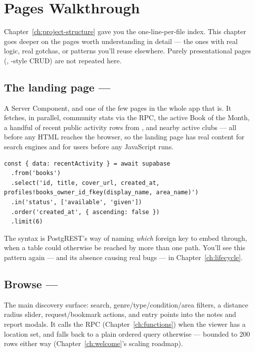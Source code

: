 \chapter{Pages Walkthrough}
\label{ch:pages}

Chapter~\ref{ch:project-structure} gave you the one-line-per-file index. This chapter goes deeper on the pages worth understanding in detail — the ones with real logic, real gotchas, or patterns you'll reuse elsewhere. Purely presentational pages (, -style CRUD) are not repeated here.

\section{The landing page — }

A Server Component, and one of the few pages in the whole app that is. It fetches, in parallel, community stats via the  RPC, the active Book of the Month, a handful of recent public activity rows from , and nearby active clubs — all before any HTML reaches the browser, so the landing page has real content for search engines and for users before any JavaScript runs.

\begin{lstlisting}[caption={Disambiguating a foreign-key embed — app/page.tsx}]
const { data: recentActivity } = await supabase
  .from('books')
  .select('id, title, cover_url, created_at, profiles!books_owner_id_fkey(display_name, area_name)')
  .in('status', ['available', 'given'])
  .order('created_at', { ascending: false })
  .limit(6)
\end{lstlisting}

The  syntax is PostgREST's way of naming \emph{which} foreign key to embed through, when a table could otherwise be reached by more than one path. You'll see this pattern again — and its absence causing real bugs — in Chapter~\ref{ch:lifecycle}.

\section{Browse — }

The main discovery surface: search, genre/type/condition/area filters, a distance radius slider, request/bookmark actions, and entry points into the notes and report modals. It calls the  RPC (Chapter~\ref{ch:functions}) when the viewer has a location set, and falls back to a plain ordered query otherwise — bounded to 200 rows either way (Chapter~\ref{ch:welcome}'s scaling roadmap).

